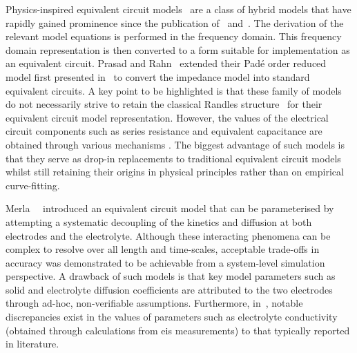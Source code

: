 Physics-inspired equivalent circuit models~\cite{Merla2018,Prasad2014,Zhang2017}
are  a  class  of  hybrid  models that  have  rapidly  gained  prominence  since
the publication  of~\cite{Jokar2016} and~\cite{Fan2015}.  The derivation  of the
relevant model  equations is performed  in the frequency domain.  This frequency
domain representation  is then converted  to a form suitable  for implementation
as  an  equivalent circuit.  Prasad  and  Rahn~\cite{Prasad2014} extended  their
Padé order  reduced model first  presented in~\cite{Prasad2013} to  convert the
impedance model into standard equivalent circuits. A key point to be highlighted
is that these family of models do not necessarily strive to retain the classical
Randles   structure~\cite{Randles1947}  for   their  equivalent   circuit  model
representation. However, the values of the electrical circuit components such as
series  resistance  and  equivalent  capacitance are  obtained  through  various
mechanisms . The biggest advantage of
such models is that they serve as drop-in replacements to traditional equivalent
circuit  models whilst  still  retaining their  origins  in physical  principles
rather   than   on   empirical   curve-fitting.

Merla~\etal{}~\cite{Merla2018} introduced  an equivalent circuit model  that can
be  parameterised by  attempting a  systematic  decoupling of  the kinetics  and
diffusion at  both electrodes  and the  electrolyte. Although  these interacting
phenomena  can  be   complex  to  resolve  over  all   length  and  time-scales,
acceptable  trade-offs in  accuracy was  demonstrated  to be  achievable from  a
system-level  simulation perspective.  A drawback  of  such models  is that  key
model  parameters  such as  solid  and  electrolyte diffusion  coefficients  are
attributed  to the  two electrodes  through ad-hoc,  non-verifiable assumptions.
Furthermore, in~\cite{Merla2018},  notable discrepancies exist in  the values of
parameters  such  as  electrolyte conductivity  (obtained  through  calculations
from  \gls{eis}   measurements)  to  that  typically   reported  in  literature.

